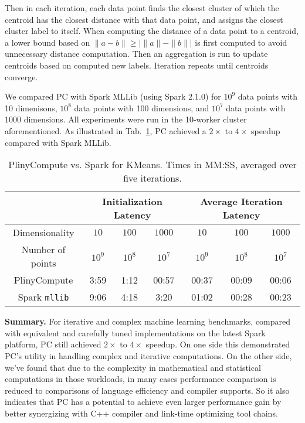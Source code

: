 Then in each iteration, each data point finds the closest cluster
of which the centroid has the closest distance with that data point, and assigns the closest
cluster label to itself. When computing the distance of a data point to a
centroid, a lower bound based on $\|a - b\| \geq |\|a\| - \|b\||$ is
first computed to avoid unnecessary distance computation. Then an aggregation is run to update centroids
based on computed new labels. Iteration repeats until centroids
converge.


We compared PC with Spark MLLib (using Spark 2.1.0) for $10^9$ data
points with 10 dimenisons, $10^8$ data points with 100 dimensions,  and $10^7$
data points with 1000
dimensions. All experiments were run in the 10-worker cluster aforementioned. 
As illustrated in Tab.~\ref{fig:KMeans}, PC achieved a $2\times$ to
$4\times$ speedup compared with Spark MLLib. 

\begin{table}[h!]
\begin{center}
\begin{tabular}{|c||c|c|c||c|c|c||}
\hline
& \multicolumn{3}{c||}{Initialization Latency} & \multicolumn{3}{c||}{Average
                                         Iteration Latency} \\
\hline
Dimensionality & $10$ & $100$ & $1000$ & $10$ & $100$ & $1000$\\
Number of points & $10^9$ & $10^8$ & $10^7$ & $10^9$ & $10^8$ & $10^7$\\
\hline
PlinyCompute &3:59 & 1:12 & 00:57 &00:37 & 00:09 & 00:06\\
Spark \texttt{mllib} &9:06  &4:18 &3:20 &01:02 & 00:28 & 00:23\\
\hline
\end{tabular}
\caption{PlinyCompute vs. Spark for KMeans. Times in MM:SS, averaged over five iterations.}
\label{fig:KMeans}
\end{center}
\end{table}


\vspace{5pt}
\noindent
\textbf{Summary.} For iterative and complex machine learning
benchmarks, compared with equivalent and carefully tuned implementations on the latest
Spark platform, PC still achieved $2 \times$ to $4 \times$
speedup. On one side this demonstrated PC's utility in handling
complex and iterative computations. On the other side, we've found that due to the complexity in mathematical and statistical
computations in those workloads, in many cases performance comparison is reduced to comparisons of
language efficiency and compiler supports. So it also indicates that PC has a
potential to achieve even larger performance gain by better
synergizing with C++ compiler and link-time optimizing tool chains.





